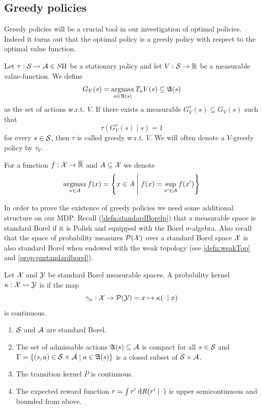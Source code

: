 \subsection{Greedy policies}

Greedy policies will be a crucial tool in our investigation of optimal
policies. Indeed it turns out that the optimal policy is a greedy policy
with respect to the optimal value function.

\begin{defn}
  Let $\tau : \mathcal{S} \leadsto \mathcal{A} \in S\Pi$ be a stationary policy and
  let $V : \mathcal{S} \to \mathbb{R}$ be a measurable value-function.
  We define
  \[ G_V(s) = \operatorname*{argmax}_{a \in \frak{A}(s)} T_a V(s) \subseteq \frak{A}(s) \]
  as the set of  actions w.r.t. $V$.
  If there exists a measurable $G_V^\tau(s) \subseteq G_V(s)$
  such that
  \[ \tau(G_V^\tau(s) \mid s) = 1 \]
  for every $s \in \mathcal{S}$, then $\tau$ is called greedy w.r.t. $V$.
  We will often denote a $V$-greedy policy by $\tau_V$.
\end{defn}
\begin{rem}
  For a function $f : \mathcal{X} \to \overline{\mathbb{R}}$ and $A \subseteq \mathcal{X}$ we denote 
  \[ \operatorname*{argmax}_{x \in A} f(x) =
  \left\{ x \in A \;\middle\vert\; f(x) = \sup_{x' \in A} f(x') \right\} \]
\end{rem}

In order to prove the existence of greedy policies we need some additional
structure on our MDP.
Recall (\cref{defn:standardBorelp}) that a measurable space is
standard Borel if it is Polish and equipped with the Borel $\sigma$-algebra.
Also recall that the space of probability measures $\mathcal{P}(\mathcal{X})$ over a
standard Borel space $\mathcal{X}$ is also standard Borel when endowed with
the weak topology (see \cref{defn:weakTop} and
\cref{prop:pxstandardborel}).

\begin{defn}
  Let $\mathcal{X}$ and $\mathcal{Y}$ be standard Borel measurable spaces.
  A probability kernel $\kappa : \mathcal{X} \leadsto \mathcal{Y}$ is
   if the map
  \[ \gamma_\kappa : \mathcal{X} \to \mathcal{P}(\mathcal{Y})
  = x \mapsto \kappa(\cdot \mid x) \]
  is continuous.
\end{defn}

\begin{sett}
  \leavevmode
  \begin{enumerate}
    \item $\mathcal{S}$ and $\mathcal{A}$ are standard Borel.
    \item The set of admissable actions 
      $\frak{A}(s) \subseteq \mathcal{A}$ is compact for all $s \in \mathcal{S}$
      and $\Gamma = \{ (s, a) \in \mathcal{S} \times \mathcal{A} \mid a \in \frak{A}(s) \}$
      is a closed subset of $\mathcal{S} \times \mathcal{A}$.
    \item The transition kernel $P$ is continuous.
    \item The expected reward function $r = \int r' \; \mathrm{d} R(r' \mid \cdot)$
      is upper semicontinuous and bounded from above.
  \end{enumerate}
  \label{sett:BS0}
\end{sett}

